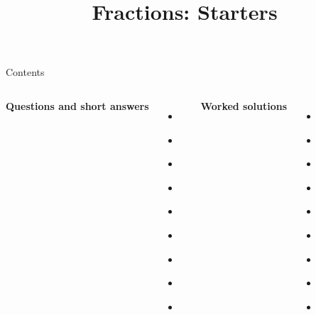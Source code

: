 \documentclass{beamer}
\title{Fractions: Starters}
\author{}
\date{}
\begin{document}
\frame{\titlepage}

\begin{frame}{Contents}
\small
\begin{columns}[T]
\textbf{Questions and short answers}
\begin{itemize}
  \item \hyperlink{q-st1}{}
  \item \hyperlink{q-st2}{}
  \item \hyperlink{q-st3}{}
  \item \hyperlink{q-st4}{}
  \item \hyperlink{q-st5}{}
  \item \hyperlink{q-st6}{}
  \item \hyperlink{q-st7}{}
  \item \hyperlink{q-st8}{}
  \item \hyperlink{q-st9}{}
\end{itemize}

\textbf{Worked solutions}
\begin{itemize}
  \item \hyperlink{work-st1}{}
  \item \hyperlink{work-st2}{}
  \item \hyperlink{work-st3}{}
  \item \hyperlink{work-st4}{}
  \item \hyperlink{work-st5}{}
  \item \hyperlink{work-st6}{}
  \item \hyperlink{work-st7}{}
  \item \hyperlink{work-st8}{}
  \item \hyperlink{work-st9}{}
\end{itemize}
\end{columns}
\end{frame}
\end{document}
